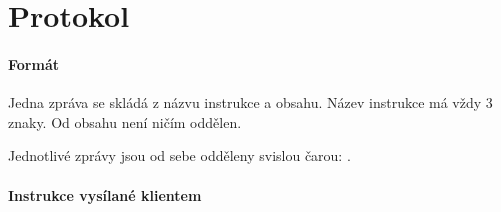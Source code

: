 \documentclass[12pt, a4paper]{report}
\begin{document}
\newpage

\section{Protokol}
\paragraph{Formát}
Jedna zpráva se skládá z názvu instrukce a obsahu. Název instrukce má vždy 3 znaky. Od obsahu není ničím oddělen.

Jednotlivé zprávy jsou od sebe odděleny svislou čarou: \textbar.

\paragraph{Instrukce vysílané klientem}
\end{document}
